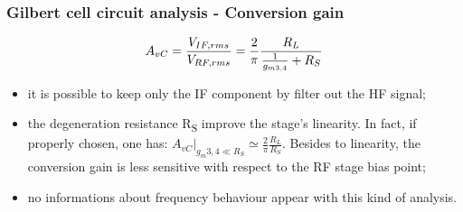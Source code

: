 \begin{frame}
	\frametitle{Gilbert cell circuit analysis - Conversion gain}
	\begin{equation}
		\label{eq:ConvGain}
		A_{vC} = \frac{V_{IF,rms}}{V_{RF,rms}} =  \frac{2}{\pi}\frac{R_L}{\frac{1}{g_{m3,4}}+R_S} \notag
	\end{equation}
	\begin{itemize}
		\item it is possible to keep only the IF component by filter out the HF signal;
		\item the degeneration resistance R\textsubscript{S} improve the stage's linearity. In fact, if properly chosen, one has: $A_{vC}|_{g_m3,4 \ll R_S}\simeq\frac{2}{\pi}\frac{R_L}{R_S}$. Besides to linearity, the conversion gain is less sensitive with respect to the RF stage bias point;
		\item no informations about frequency behaviour appear with this kind of analysis.
	\end{itemize}  
\end{frame}